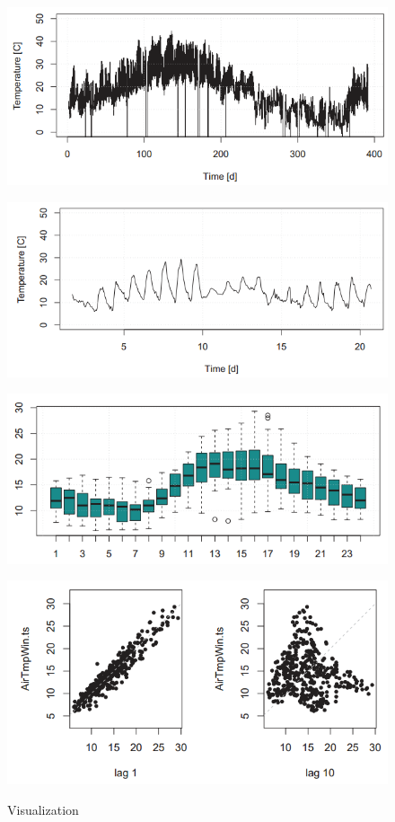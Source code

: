 			\begin{figure}[H]\centering
				\hfill
				\begin{minipage}[c]{0.42\textwidth}
					\includegraphics[width=0.7\linewidth]{images/tsAirTempFull.png}
					\label{Fig:tsAirTempFull}
				\end{minipage}
				\hfill
				\begin{minipage}[c]{0.42\textwidth}
					\includegraphics[width=0.7\linewidth]{images/tsAirTempDetail.png}
					\label{Fig:tsAirTempDetail}
				\end{minipage}
				\hfill
				
				\hfill
				\begin{minipage}[t]{.42\textwidth}
					\includegraphics[width=0.7\linewidth]{images/tsBoxPlot.png}
					\label{Fig:tsBoxPlot}
				\end{minipage}
				\hfill
				\begin{minipage}[t]{.42\textwidth}
					\includegraphics[width=0.7\linewidth]{images/tsLagPlot.png}
					\label{Fig:tsLagPlot}
				\end{minipage}
				\hfill
			\caption{Visualization}
			\end{figure}
		
